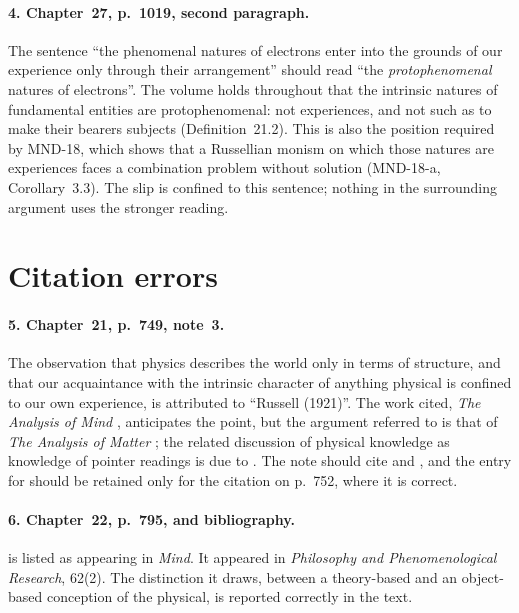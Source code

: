 \documentclass{situationist-preprint}
\begin{document}
\paragraph{4. Chapter~27, p.~1019, second paragraph.} The sentence \enquote{the phenomenal natures of electrons enter into the grounds of our experience only through their arrangement} should read \enquote{the \emph{protophenomenal} natures of electrons}. The volume holds throughout that the intrinsic natures of fundamental entities are protophenomenal: not experiences, and not such as to make their bearers subjects (Definition~21.2). This is also the position required by MND-18, which shows that a Russellian monism on which those natures are experiences faces a combination problem without solution (MND-18-a, Corollary~3.3). The slip is confined to this sentence; nothing in the surrounding argument uses the stronger reading.

\section{Citation errors}

\paragraph{5. Chapter~21, p.~749, note~3.} The observation that physics describes the world only in terms of structure, and that our acquaintance with the intrinsic character of anything physical is confined to our own experience, is attributed to \enquote{Russell (1921)}. The work cited, \emph{The Analysis of Mind} \citep{Russell1921}, anticipates the point, but the argument referred to is that of \emph{The Analysis of Matter} \citep{Russell1927}; the related discussion of physical knowledge as knowledge of pointer readings is due to \citet{Eddington1928}. The note should cite \citet{Russell1927} and \citet{Eddington1928}, and the entry for \citet{Russell1921} should be retained only for the citation on p.~752, where it is correct.

\paragraph{6. Chapter~22, p.~795, and bibliography.} \citet{Stoljar2001} is listed as appearing in \emph{Mind}. It appeared in \emph{Philosophy and Phenomenological Research}, 62(2). The distinction it draws, between a theory-based and an object-based conception of the physical, is reported correctly in the text.
\end{document}

